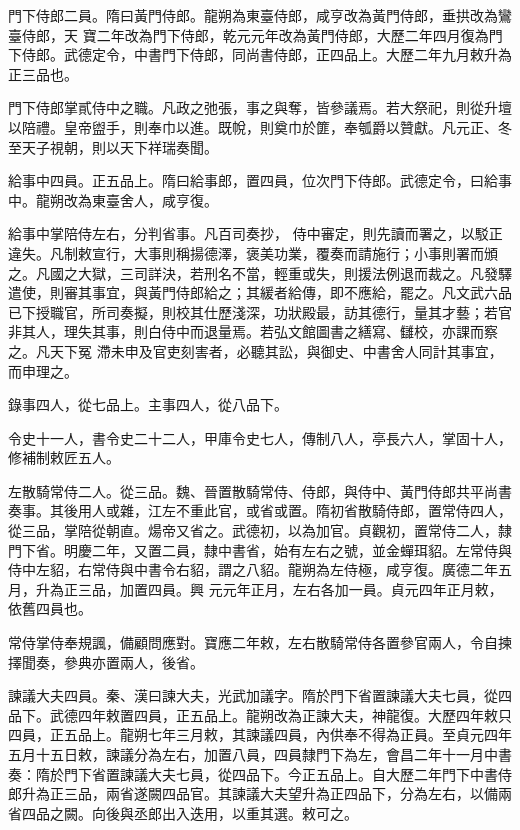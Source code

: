 \begin{pinyinscope}
 門下侍郎二員。隋曰黃門侍郎。龍朔為東臺侍郎，咸亨改為黃門侍郎，垂拱改為鸞臺侍郎，天
 寶二年改為門下侍郎，乾元元年改為黃門侍郎，大歷二年四月復為門下侍郎。武德定令，中書門下侍郎，同尚書侍郎，正四品上。大歷二年九月敕升為正三品也。



 門下侍郎掌貳侍中之職。凡政之弛張，事之與奪，皆參議焉。若大祭祀，則從升壇以陪禮。皇帝盥手，則奉巾以進。既帨，則奠巾於篚，奉瓠爵以贊獻。凡元正、冬至天子視朝，則以天下祥瑞奏聞。



 給事中四員。正五品上。隋曰給事郎，置四員，位次門下侍郎。武德定令，曰給事中。龍朔改為東臺舍人，咸亨復。



 給事中掌陪侍左右，分判省事。凡百司奏抄，
 侍中審定，則先讀而署之，以駁正違失。凡制敕宣行，大事則稱揚德澤，褒美功業，覆奏而請施行；小事則署而頒之。凡國之大獄，三司詳決，若刑名不當，輕重或失，則援法例退而裁之。凡發驛遣使，則審其事宜，與黃門侍郎給之；其緩者給傳，即不應給，罷之。凡文武六品已下授職官，所司奏擬，則校其仕歷淺深，功狀殿最，訪其德行，量其才藝；若官非其人，理失其事，則白侍中而退量焉。若弘文館圖書之繕寫、讎校，亦課而察之。凡天下冤
 滯未申及官吏刻害者，必聽其訟，與御史、中書舍人同計其事宜，而申理之。



 錄事四人，從七品上。主事四人，從八品下。



 令史十一人，書令史二十二人，甲庫令史七人，傳制八人，亭長六人，掌固十人，修補制敕匠五人。



 左散騎常侍二人。從三品。魏、晉置散騎常侍、侍郎，與侍中、黃門侍郎共平尚書奏事。其後用人或雜，江左不重此官，或省或置。隋初省散騎侍郎，置常侍四人，從三品，掌陪從朝直。煬帝又省之。武德初，以為加官。貞觀初，置常侍二人，隸門下省。明慶二年，又置二員，隸中書省，始有左右之號，並金蟬珥貂。左常侍與侍中左貂，右常侍與中書令右貂，謂之八貂。龍朔為左侍極，咸亨復。廣德二年五月，升為正三品，加置四員。興
 元元年正月，左右各加一員。貞元四年正月敕，依舊四員也。



 常侍掌侍奉規諷，備顧問應對。寶應二年敕，左右散騎常侍各置參官兩人，令自揀擇聞奏，參典亦置兩人，後省。



 諫議大夫四員。秦、漢曰諫大夫，光武加議字。隋於門下省置諫議大夫七員，從四品下。武德四年敕置四員，正五品上。龍朔改為正諫大夫，神龍復。大歷四年敕只四員，正五品上。龍朔七年三月敕，其諫議四員，內供奉不得為正員。至貞元四年五月十五日敕，諫議分為左右，加置八員，四員隸門下為左，會昌二年十一月中書奏：隋於門下省置諫議大夫七員，從四品下。今正五品上。自大歷二年門下中書侍郎升為正三品，兩省遂闕四品官。其諫議大夫望升為正四品下，分為左右，以備兩省四品之闕。向後與丞郎出入迭用，以重其選。敕可之。




\end{pinyinscope}
